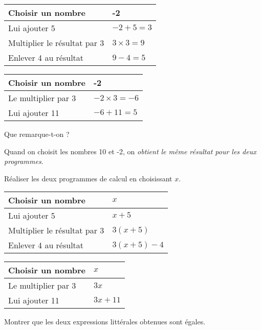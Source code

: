 \documentclass[../Cours.tex]{subfiles}
\begin{document}
\begin{questions}
    {\color{rouge}
        \begin{center}
        \begin{tabularx}{0.45\linewidth}{|l|X|}
            Choisir un nombre & -2 \\\hline
            Lui ajouter 5 & $-2+5=3$ \\ \hline
            Multiplier le résultat par 3 & $3 \times 3 = 9$ \\ \hline
            Enlever 4 au résultat & $9-4 = 5$ \\
        \end{tabularx}
        \begin{tabularx}{0.45\linewidth}{|l|X|}
            Choisir un nombre & -2 \\\hline
            Le multiplier par 3 & $-2 \times 3 = -6$ \\ \hline
            Lui ajouter 11 & $-6+11 = 5$
        \end{tabularx}
        \end{center}
    }
    
\question Que remarque-t-on ?

{\color{rouge}
    Quand on choisit les nombres 10 et -2, on \emph{obtient le même résultat pour les deux programmes}.
}

\question 
    \subquestion Réaliser les deux programmes de calcul en choisissant $x$.

    {\color{rouge}
        \begin{center}
        \begin{tabularx}{0.45\linewidth}{|l|X|}
            Choisir un nombre & $x$ \\\hline
            Lui ajouter 5 & $x+5$ \\ \hline
            Multiplier le résultat par 3 & $3(x+5)$ \\ \hline
            Enlever 4 au résultat & $3(x+5)-4$ \\
        \end{tabularx}
        \begin{tabularx}{0.45\linewidth}{|l|X|}
            Choisir un nombre & $x$ \\\hline
            Le multiplier par 3 & $3x$ \\ \hline
            Lui ajouter 11 & $3x+11$
        \end{tabularx}
        \end{center}
    }

    \subquestion Montrer que les deux expressions littérales obtenues sont égales.


\end{questions}
\end{document}

